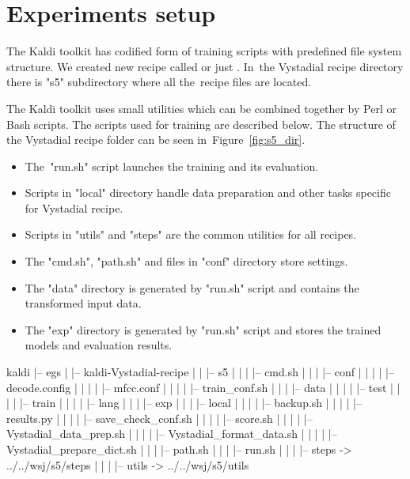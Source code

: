 \chapter{Experiments setup} 
\label{cha:setup}

\small{The Kaldi toolkit has codified form of training scripts with predefined file system structure. 
We created new recipe called  or just . 
In~the Vystadial recipe directory there is "s5" subdirectory where all the~recipe files are located. 

The Kaldi toolkit uses small utilities which can be combined together by Perl or Bash scripts.
The scripts used for training are described below. 
The structure of the Vystadial recipe folder can be seen in~Figure~\ref{fig:s5_dir}.
\begin{itemize}
    \item The~"run.sh" script launches the training and its evaluation.
    \item Scripts in "local" directory handle data preparation and other tasks specific for Vystadial recipe.
    \item Scripts in "utils" and "steps" are the common utilities for all recipes. 
    \item The "cmd.sh", "path.sh" and files in "conf" directory store settings.
    \item The "data" directory is generated by "run.sh" script and contains the transformed input data.
    \item The "exp" directory is generated by "run.sh" script and stores the trained models and evaluation results.
\end{itemize}

\tiny\begin{verbbox}
kaldi
|-- egs
|   |-- kaldi-Vystadial-recipe
|   |   |-- s5
|   |   |   |-- cmd.sh
|   |   |   |-- conf
|   |   |   |   |-- decode.config
|   |   |   |   |-- mfcc.conf
|   |   |   |   |-- train_conf.sh
|   |   |   |-- data
|   |   |   |   |-- test 
|   |   |   |   |-- train
|   |   |   |   |-- lang
|   |   |   |-- exp
|   |   |   |-- local
|   |   |   |   |-- backup.sh
|   |   |   |   |-- results.py
|   |   |   |   |-- save_check_conf.sh
|   |   |   |   |-- score.sh
|   |   |   |   |-- Vystadial_data_prep.sh
|   |   |   |   |-- Vystadial_format_data.sh
|   |   |   |   |-- Vystadial_prepare_dict.sh
|   |   |   |-- path.sh
|   |   |   |-- run.sh
|   |   |   |-- steps -> ../../wsj/s5/steps
|   |   |   |-- utils -> ../../wsj/s5/utils
\end{verbbox}
\normalsize

}
